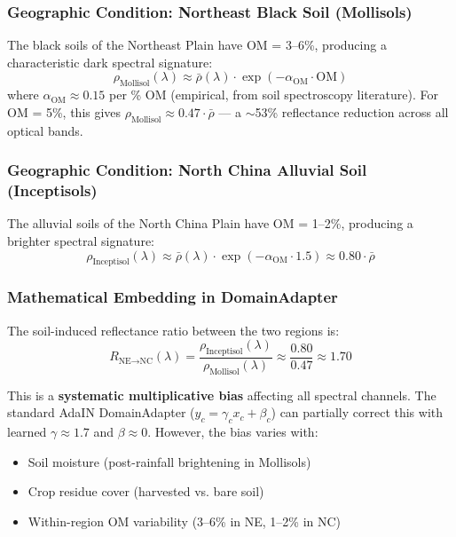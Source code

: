 \subsubsection{Geographic Condition: Northeast Black Soil (Mollisols)}

The black soils of the Northeast Plain have OM = 3--6\%, producing a
characteristic dark spectral signature:
\begin{equation}\label{eq:black-soil}
    \rho_{\text{Mollisol}}(\lambda) \approx \bar{\rho}(\lambda) \cdot
    \exp(-\alpha_{\text{OM}} \cdot \text{OM})
\end{equation}
where $\alpha_{\text{OM}} \approx 0.15$ per \% OM (empirical, from soil
spectroscopy literature). For OM = 5\%, this gives
$\rho_{\text{Mollisol}} \approx 0.47 \cdot \bar{\rho}$ — a $\sim$53\%
reflectance reduction across all optical bands.

\subsubsection{Geographic Condition: North China Alluvial Soil (Inceptisols)}

The alluvial soils of the North China Plain have OM = 1--2\%, producing
a brighter spectral signature:
\begin{equation}
    \rho_{\text{Inceptisol}}(\lambda) \approx \bar{\rho}(\lambda) \cdot
    \exp(-\alpha_{\text{OM}} \cdot 1.5) \approx 0.80 \cdot \bar{\rho}
\end{equation}

\subsubsection{Mathematical Embedding in DomainAdapter}

The soil-induced reflectance ratio between the two regions is:
\begin{equation}\label{eq:soil-ratio}
    R_{\text{NE}\to\text{NC}}(\lambda) =
    \frac{\rho_{\text{Inceptisol}}(\lambda)}{\rho_{\text{Mollisol}}(\lambda)}
    \approx \frac{0.80}{0.47} \approx 1.70
\end{equation}

This is a \textbf{systematic multiplicative bias} affecting all spectral
channels. The standard AdaIN DomainAdapter ($y_c = \gamma_c x_c + \beta_c$)
can partially correct this with learned $\gamma \approx 1.7$ and
$\beta \approx 0$. However, the bias varies with:
\begin{itemize}[nosep]
    \item Soil moisture (post-rainfall brightening in Mollisols)
    \item Crop residue cover (harvested vs. bare soil)
    \item Within-region OM variability (3--6\% in NE, 1--2\% in NC)
\end{itemize}

